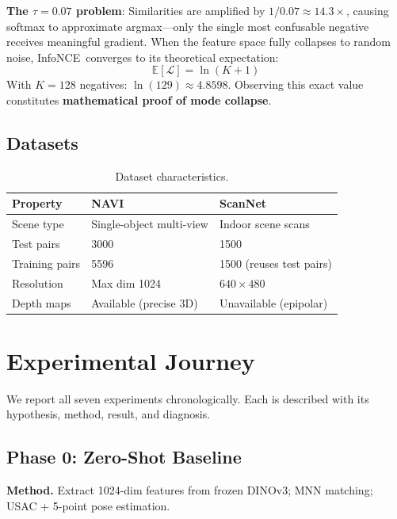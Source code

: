 \documentclass[11pt,a4paper]{article}
\newcommand{\infonce}{InfoNCE\ }
\begin{document}
\textbf{The $\tau = 0.07$ problem}: Similarities are amplified by $1/0.07 \approx 14.3\times$, causing softmax to approximate argmax---only the single most confusable negative receives meaningful gradient. When the feature space fully collapses to random noise, \infonce converges to its theoretical expectation:
\begin{equation}
\mathbb{E}[\mathcal{L}] = \ln(K+1)
\end{equation}
With $K = 128$ negatives: $\ln(129) \approx 4.8598$. Observing this exact value constitutes \textbf{mathematical proof of mode collapse}.

\subsection{Datasets}

\begin{table}[t]
\centering\small
\caption{Dataset characteristics.}
\label{tab:datasets}
\begin{tabular}{@{}lll@{}}
\toprule
\textbf{Property} & \textbf{NAVI~\cite{navi}} & \textbf{ScanNet~\cite{scannet}} \\
\midrule
Scene type      & Single-object multi-view & Indoor scene scans \\
Test pairs      & 3000 & 1500 \\
Training pairs  & 5596 & 1500 (reuses test pairs) \\
Resolution      & Max dim 1024 & $640\!\times\!480$ \\
Depth maps      & Available (precise 3D) & Unavailable (epipolar) \\
\bottomrule
\end{tabular}
\end{table}

\section{Experimental Journey}

We report all seven experiments chronologically. Each is described with its hypothesis, method, result, and diagnosis.

\subsection{Phase 0: Zero-Shot Baseline}

\textbf{Method.} Extract 1024-dim features from frozen DINOv3; MNN matching; USAC + 5-point pose estimation.
\end{document}
